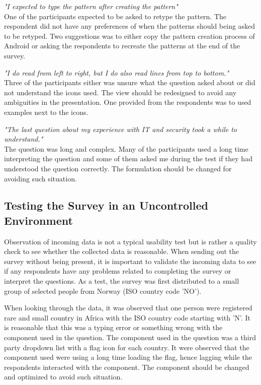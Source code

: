   {\it "I expected to type the pattern after creating the pattern"}\\ 
  One of the participants expected to be asked to retype the pattern. The respondent did not have any preferences of when the patterns should being asked to be retyped. Two suggestions was to either copy the pattern creation process of Android or asking the respondents to recreate the patterns at the end of the survey.

  {\it "I do read from left to right, but I do also read lines from top to bottom."}\\ 
  Three of the participants either was unsure what the question asked about or did not understand the icons used. The view should be redesigned to avoid any ambiguities in the presentation. One provided from the respondents was to used examples next to the icons. 

  {\it "The last question about my experience with IT and security took a while to understand."}\\ 
  The question was long and complex. Many of the participants used a long time interpreting the question and some of them asked me during the test if they had understood the question correctly. The formulation should be changed for avoiding such situation.

  \subsection{Testing the Survey in an Uncontrolled Environment}
  Observation of incoming data is not a typical usability test but is rather a quality check to see whether the collected data is reasonable. When sending out the survey without being present, it is important to validate the incoming data to see if any respondents have any problems related to completing the survey or interpret the questions. As a test, the survey was first distributed to a small group of selected people from Norway (ISO country code 'NO').

  When looking through the data, it was observed that one person were registered rare and small country in Africa with the ISO country code starting with 'N'. It is reasonable that this was a typing error or something wrong with the component used in the question. The component used in the question was a third party dropdown list with a flag icon for each country. It were observed that the component used were using a long time loading the flag, hence lagging while the respondents interacted with the component. The component should be changed and optimized to avoid such situation. 

